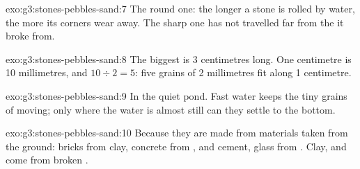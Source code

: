 \begin{solution}{exo:g3:stones-pebbles-sand:7}
The round one: the longer a stone is rolled by water, the more its corners
wear away. The sharp one has not travelled far from the  it broke from.
\end{solution}

\begin{solution}{exo:g3:stones-pebbles-sand:8}
The biggest  is 3 centimetres long. One centimetre is 10
millimetres, and $10 \div 2 = 5$: five grains of 2 millimetres fit along
1 centimetre.
\end{solution}

\begin{solution}{exo:g3:stones-pebbles-sand:9}
In the quiet pond. Fast water keeps the tiny grains of  moving; only
where the water is almost still can they settle to the bottom.
\end{solution}

\begin{solution}{exo:g3:stones-pebbles-sand:10}
Because they are made from materials taken from the ground: bricks from
clay, concrete from ,  and cement, glass from . Clay,  and
 come from broken .
\end{solution}
